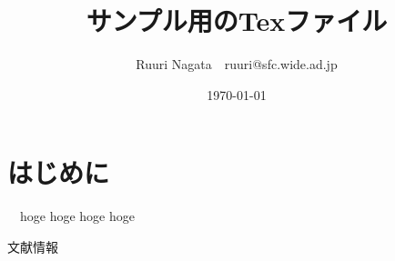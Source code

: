 \documentclass[twocolumn, a4j]{article}
\title{サンプル用のTexファイル}
\author{Ruuri Nagata\footnotemark[2]　ruuri@sfc.wide.ad.jp}
\date{\today}
\renewcommand{\thefootnote}{\fnsymbol{footnote}}
\renewcommand{\thefootnote}{\arabic{footnote}}
\begin{document}

\renewcommand{\thefootnote}{\fnsymbol{footnote}}
\renewcommand{\thefootnote}{\arabic{footnote}}

\section{はじめに}

  　hoge hoge hoge hoge

\renewcommand{\refname}{参考文献}
\begin{thebibliography}{数字}
   文献情報
\end{thebibliography}
\end{document}
